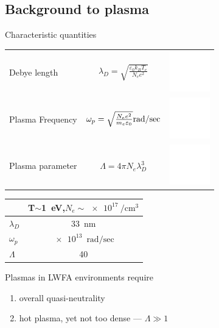 \documentclass[dvipsnames]{beamer}
\begin{document}
 \subsection{Background to plasma}
 \begin{frame}{Characteristic quantities}
   \begin{tabular}{l c r}
    Debye length & $\lambda_D=\sqrt{\frac{\varepsilon_0 k_B T_e}{N_e e^2}}$ &  \includegraphics[height=50pt]{figures/theory/white_background.png}\\ 
    Plasma Frequency & $ \omega_p=\sqrt{\frac{N_e e^2}{m_e \varepsilon_0}}\si[per-mode=fraction]{\radian\per\sec} $ & \includegraphics[height=50pt]{figures/theory/white_background.png}\\
    Plasma parameter & $ \Lambda=4\pi N_e \lambda_D ^3 $ & \includegraphics[height=50pt]{figures/theory/white_background.png} \\
   \end{tabular}
 \end{frame}
 \begin{frame}{}
     \begin{table}[]
   \begin{tabular}{l | c}
     & T$\sim$\SI{1}{\electronvolt},$N_e\sim\SI{e17}{\per\cubic\cm}$ \\ \hline 
     $\lambda_D$     & \SI{33}{\nm}     \\
     $\omega_p$      & $\SI[per-mode=fraction]{e13}{\radian\per\sec}$   \\
     $\Lambda$ & 40
   \end{tabular}
     \end{table}
 Plasmas in LWFA environments require
   \begin{enumerate}
     \item[\textbullet] overall quasi-neutrality
     \item[\textbullet] hot plasma, yet not too dense --- $\Lambda \gg 1$
   \end{enumerate}
 \end{frame}
\end{document}
